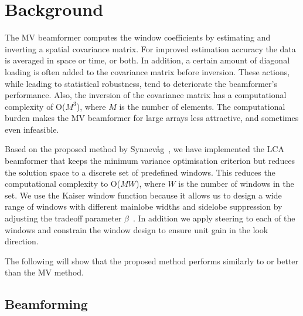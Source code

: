\documentclass[10pt,journal,draftclsnofoot,onecolumn]{IEEEtran}
\newcommand\1{\vec 1}
\begin{document}
\section{Background}



The MV beamformer computes the window coefficients by estimating and inverting a spatial covariance matrix. For improved estimation accuracy the data is averaged in space or time, or both. In addition, a certain amount of diagonal loading is often added to the covariance matrix before inversion. These actions, while leading to statistical robustness, tend to deteriorate the beamformer's performance. Also, the inversion of the covariance matrix has a computational complexity of O($M^3$), where $M$ is the number of elements. The computational burden makes the MV beamformer for large arrays less attractive, and sometimes even infeasible.

Based on the proposed method by Synnevåg~\cite{syn11}, we have implemented the LCA beamformer that keeps the minimum variance optimisation criterion but reduces the solution space to a discrete set of predefined windows. This reduces the computational complexity to O($MW$), where $W$ is the number of windows in the set. We use the Kaiser window function because it allows us to design a wide range of windows with different mainlobe widths and sidelobe suppression by adjusting the tradeoff parameter $\beta$~\cite{kai66}. In addition we apply steering to each of the windows and constrain the window design to ensure unit gain in the look direction.

The following will show that the proposed method performs similarly to or better than the MV method.


\subsection{Beamforming}
\end{document}
